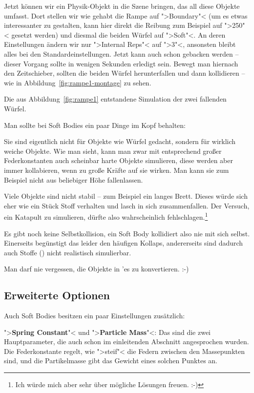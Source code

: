 \documentclass[10pt,DIV=14,a4paper]{scrartcl}
\begin{document}
Jetzt können wir ein Physik-Objekt in die Szene bringen, das all diese
Objekte umfasst. Dort stellen wir wie gehabt die Rampe auf ">Boundary"<
(um es etwas interessanter zu gestalten, kann hier direkt die Reibung
zum Beispiel auf ">250"< gesetzt werden) und diesmal die beiden Würfel
auf ">Soft"<. An deren Einstellungen ändern wir nur ">Internal Reps"<
auf ">3"<, ansonsten bleibt alles bei den Standardeinstellungen. Jetzt
kann auch schon gebacken werden -- dieser Vorgang sollte in wenigen
Sekunden erledigt sein. Bewegt man hiernach den Zeitschieber, sollten
die beiden Würfel herunterfallen und dann kollidieren -- wie in
Abbildung~\ref{fig:rampe1-montage} zu sehen.

{Die aus Abbildung~\ref{fig:rampe1} entstandene Simulation der zwei
fallenden Würfel.}

Man sollte bei Soft Bodies ein paar Dinge im Kopf behalten:
\itA
	\item Sie sind eigentlich nicht für Objekte wie Würfel gedacht,
	sondern für wirklich weiche Objekte. Wie man sieht, kann man zwar
	mit entsprechend großer Federkonstanten auch scheinbar harte Objekte
	simulieren, diese werden aber immer kollabieren, wenn zu große
	Kräfte auf sie wirken. Man kann sie zum Beispiel nicht aus
	beliebiger Höhe fallenlassen.

	\item Viele Objekte sind nicht stabil -- zum Beispiel ein langes
	Brett. Dieses würde sich eher wie ein Stück Stoff verhalten und
	lasch in sich zusammenfallen. Der Versuch, ein Katapult zu
	simulieren, dürfte also wahrscheinlich fehlschlagen.\footnote{Ich
	würde mich aber sehr über mögliche Lösungen freuen. :-)}

	\item Es gibt noch keine Selbstkollision, ein Soft Body kollidiert
	also nie mit sich selbst. Einerseits begünstigt das leider den
	häufigen Kollaps, andererseits sind dadurch auch Stoffe
	() nicht realistisch simulierbar.

	\item Man darf nie vergessen, die Objekte in \TriMesh'es zu
	konvertieren. :-)

\itE

\subsection{Erweiterte Optionen}
Auch Soft Bodies besitzen ein paar Einstellungen zusätzlich:
\itA
	\item ">\textbf{Spring Constant}"< und ">\textbf{Particle Mass}"<:
	Das sind die zwei Hauptparameter, die auch schon im einleitenden
	Abschnitt angesprochen wurden. Die Federkonstante regelt, wie
	">steif"< die Federn zwischen den Massepunkten sind, und die
	Partikelmasse gibt das Gewicht eines solchen Punktes an.
\end{document}
